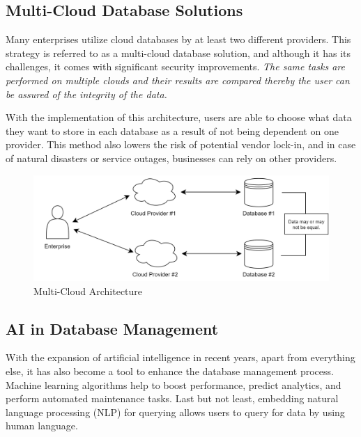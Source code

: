 \documentclass[12pt, a4paper]{article}
\begin{document}
    \subsection{Multi-Cloud Database Solutions}
        Many enterprises utilize cloud databases by at least two different providers. This strategy is referred to as a multi-cloud database solution, and although it has its challenges, it comes with significant security improvements. \textit{The same tasks are performed on multiple clouds and their results are compared thereby the user can be assured of the integrity of the data.}\cite{17}\par With the implementation of this architecture, users are able to choose what data they want to store in each database as a result of not being dependent on one provider. This method also lowers the risk of potential vendor lock-in, and in case of natural disasters or service outages, businesses can rely on other providers.
        \begin{figure}[ht]
            \centering
            \includegraphics[width=1\linewidth]{images/multicloud.png}
            \caption{Multi-Cloud Architecture}
            \label{fig:multicloud}
        \end{figure}
        
    \subsection{AI in Database Management}
        With the expansion of artificial intelligence in recent years, apart from everything else, it has also become a tool to enhance the database management process. Machine learning algorithms help to boost performance, predict analytics, and perform automated maintenance tasks. Last but not least, embedding natural language processing (NLP) for querying allows users to query for data by using human language.
\clearpage
\end{document}
